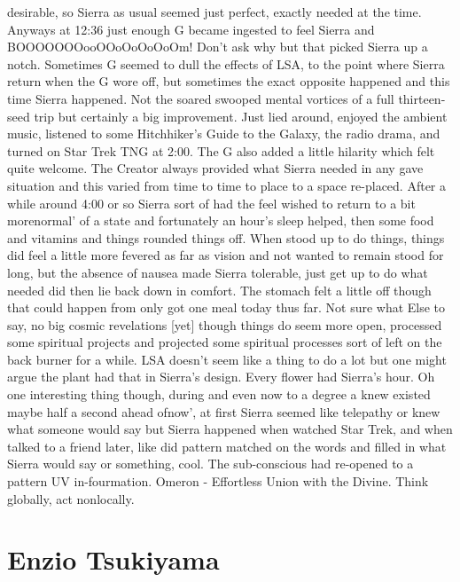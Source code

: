 \documentclass[12pt]{book}
\begin{document}
desirable, so Sierra as usual seemed just perfect, exactly needed at the time. Anyways at 12:36 just enough G became ingested to feel Sierra and BOOOOOOOooOOoOoOoOoOm! Don't ask why but that picked Sierra up a notch. Sometimes G seemed to dull the effects of LSA, to the point where Sierra return when the G wore off, but sometimes the exact opposite happened and this time Sierra happened. Not the soared swooped mental vortices of a full thirteen-seed trip but certainly a big improvement. Just lied around, enjoyed the ambient music, listened to some Hitchhiker's Guide to the Galaxy, the radio drama, and turned on Star Trek TNG at 2:00. The G also added a little hilarity which felt quite welcome. The Creator always provided what Sierra needed in any gave situation and this varied from time to time to place to a space re-placed. After a while around 4:00 or so Sierra sort of had the feel wished to return to a bit morenormal' of a state and fortunately an hour's sleep helped, then some food and vitamins and things rounded things off. When stood up to do things, things did feel a little more fevered as far as vision and not wanted to remain stood for long, but the absence of nausea made Sierra tolerable, just get up to do what needed did then lie back down in comfort. The stomach felt a little off though that could happen from only got one meal today thus far. Not sure what Else to say, no big cosmic revelations [yet] though things do seem more open, processed some spiritual projects and projected some spiritual processes sort of left on the back burner for a while. LSA doesn't seem like a thing to do a lot but one might argue the plant had that in Sierra's design. Every flower had Sierra's hour. Oh one interesting thing though, during and even now to a degree a knew existed maybe half a second ahead ofnow', at first Sierra seemed like telepathy or knew what someone would say but Sierra happened when watched Star Trek, and when talked to a friend later, like did pattern matched on the words and filled in what Sierra would say or something, cool. The sub-conscious had re-opened to a pattern UV in-fourmation. Omeron - Effortless Union with the Divine. Think globally, act nonlocally.



\chapter{Enzio Tsukiyama}
\end{document}

